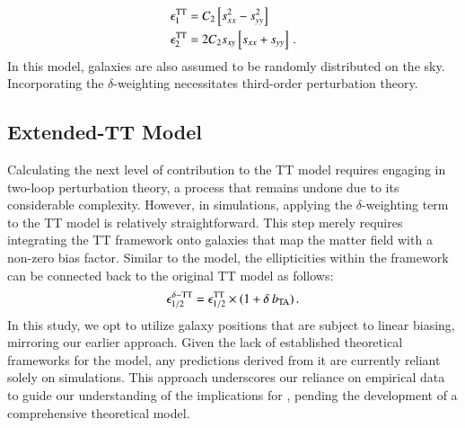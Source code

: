 \begin{equation}
\begin{split}
\epsilon_1^{\rm TT} &= C_2  \left[ s_{xx}^2 - s_{yy}^2\right] \\
 \epsilon_2^{\rm TT} &= 2 C_2 s_{xy}\left[s_{xx}+s_{yy}  \right]\, .
\end{split}
\end{equation}
In this model, galaxies are also assumed to be randomly distributed on the sky. 
Incorporating the $\delta$-weighting necessitates third-order perturbation theory.



\subsection{Extended-TT Model}
\label{subsec:IA_th_extTT}



Calculating the next level of contribution to the TT model requires engaging in two-loop perturbation theory, a process that remains undone due to its considerable complexity.
However, in simulations, applying the $\delta$-weighting term to the TT model is relatively straightforward.
This step merely requires integrating the TT framework onto galaxies that map the matter field with a non-zero bias factor. 
Similar to the \dNLA model, the ellipticities within the \dTT framework can be connected back to the original TT model as follows:
\begin{eqnarray}
\epsilon_{1/2}^{\delta-\rm TT} = \epsilon_{1/2}^{\rm TT}\times(1 + \delta \: b_{\rm TA}) \, .
\label{eq:tidal_th_deltaTT}
\end{eqnarray}
In this study, we opt to utilize galaxy positions that are subject to linear biasing, mirroring our earlier approach.
Given the lack of established theoretical frameworks for the \dTT model, any predictions derived from it are currently reliant solely on simulations.
 This approach underscores our reliance on empirical data to guide our understanding of the implications for \dTT, pending the development of a comprehensive theoretical model.

